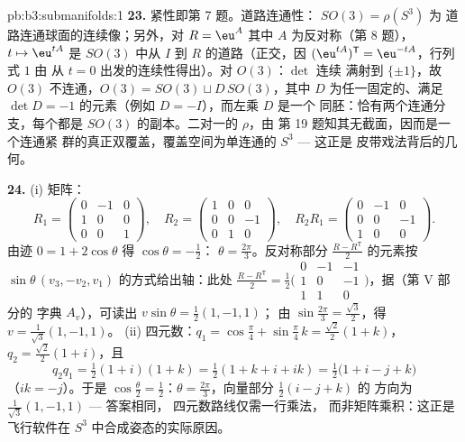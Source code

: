 \begin{solution}{pb:b3:submanifolds:1}
\textbf{23.} 紧性即第 7 题。道路连通性：
$SO(3) = \rho(S^3)$ 为
道路连通球面的连续像；另外，对 $R = \eu^{A}$
其中 $A$ 为反对称（第 8 题），$t \mapsto \eu^{tA}$
是 $SO(3)$ 中从 $I$ 到 $R$ 的道路（正交，因
$(\eu^{tA})^{\mathsf T} = \eu^{-tA}$，行列式 $1$ 由
从 $t = 0$ 出发的连续性得出）。对 $O(3)$：$\det$ 连续
满射到 $\{\pm1\}$，故 $O(3)$ 不连通，$O(3) = SO(3)
\sqcup D\,SO(3)$，其中 $D$ 为任一固定的、满足 $\det D = -1$
的元素（例如 $D = -I$），而左乘 $D$ 是一个
同胚：恰有两个连通分支，每个都是
$SO(3)$ 的副本。二对一的 $\rho$，由
第 19 题知其无截面，因而是一个连通紧
群的真正双覆盖，覆盖空间为单连通的 $S^3$ --- 这正是
皮带戏法背后的几何。

\textbf{24.} (i) 矩阵：
\[
R_1 = \begin{pmatrix} 0 & -1 & 0\\ 1 & 0 & 0\\ 0 & 0 & 1
\end{pmatrix},
\quad
R_2 = \begin{pmatrix} 1 & 0 & 0\\ 0 & 0 & -1\\ 0 & 1 & 0
\end{pmatrix},
\quad
R_2R_1 = \begin{pmatrix} 0 & -1 & 0\\ 0 & 0 & -1\\ 1 & 0 &
0\end{pmatrix}.
\]
由迹 $0 = 1 + 2\cos\theta$ 得 $\cos\theta = -\frac12$：
$\theta = \frac{2\pi}3$。反对称部分 $\frac{R -
R^{\mathsf T}}2$ 的元素按 $\sin\theta\,(v_3,
-v_2, v_1)$ 的方式给出轴：此处 $\frac{R - R^{\mathsf T}}2 =
\frac12\bigl(\begin{smallmatrix}0 & -1 & -1\\ 1 & 0 & -1\\ 1
& 1 & 0\end{smallmatrix}\bigr)$，据（第 V 部分的
字典 $A_v$），可读出 $v\sin\theta = \frac12(1, -1, 1)$；
由 $\sin\frac{2\pi}3 = \frac{\sqrt3}2$，得 $v = \frac1{\sqrt3}(1,
-1, 1)$。
(ii) 四元数：$q_1 = \cos\frac\pi4 + \sin\frac\pi4\,k =
\frac{\sqrt2}2(1 + k)$，$q_2 = \frac{\sqrt2}2(1 + i)$，且
\[
q_2q_1 = \tfrac12(1 + i)(1 + k) = \tfrac12(1 + k + i + ik)
= \tfrac12\bigl(1 + i - j + k\bigr)
\]
（$ik = -j$）。于是 $\cos\frac\theta2 = \frac12$：$\theta =
\frac{2\pi}3$，向量部分 $\frac12(i - j + k)$ 的
方向为 $\frac1{\sqrt3}(1, -1, 1)$ --- 答案相同，
四元数路线仅需一行乘法，
而非矩阵乘积：这正是
飞行软件在 $S^3$ 中合成姿态的实际原因。


\end{solution}

